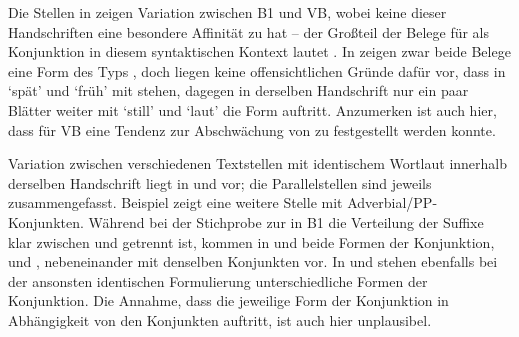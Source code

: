 Die Stellen in  zeigen Variation zwischen B1
und VB, wobei keine dieser Handschriften eine besondere Affinität zu
 hat -- der Großteil der Belege für  als
Konjunktion in diesem syntaktischen Kontext lautet . In
 zeigen zwar beide Belege eine Form des Typs
, doch liegen keine offensichtlichen Gründe dafür vor, dass in
  `spät' und  `früh'
mit  stehen, dagegen in der\-selben Handschrift nur ein paar Blätter
weiter mit  `still' und  `laut' die Form
 auftritt. Anzumerken ist auch hier, dass für VB eine
Tendenz zur Abschwächung von  zu  festgestellt werden
konnte.

Variation zwischen verschiedenen Textstellen mit identischem Wortlaut innerhalb
der\-selben Handschrift liegt in  und 
vor; die Parallelstellen sind jeweils zusammengefasst.
Beispiel  zeigt eine weitere Stelle mit
Adverbial/PP-Konjunkten. Während bei der
Stichprobe zur  in B1 die Verteilung der Suffixe klar
zwischen  und  getrennt ist, kommen in
 und  beide Formen der Konjunktion,
 und , nebeneinander mit denselben Konjunkten vor. In
 und  stehen ebenfalls bei der
ansonsten identischen Formulierung unterschiedliche Formen der Konjunktion. Die
Annahme, dass die jeweilige Form der Konjunktion in Abhängigkeit von den
Konjunkten auftritt, ist auch hier unplausibel.

